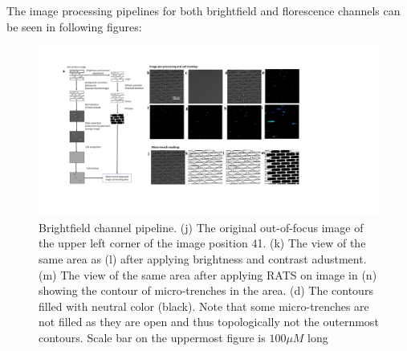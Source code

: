 \documentclass[pdftex,12pt,a4paper]{report}
\begin{document}
The image processing pipelines for both brightfield and florescence channels can be seen in following figures:


\begin{landscape}
\begin{figure}[H]
   \centering
    \includegraphics[height=0.95\textheight]{images/pipeline/01.pdf}
    \caption[Brightfield channel pipeline]{Brightfield channel pipeline. (j) The original out-of-focus image of the upper left corner of  the image position 41. (k) The view of the same area as (l) after applying brightness and contrast adustment. (m) The view of the same area after applying RATS on image in (n) showing the contour of micro-trenches in the area. (d) The contours filled with neutral color (black). Note that some micro-trenches are not filled as they are open and thus topologically not the outernmost contours. Scale bar on the uppermost figure is $100 \mu M$ long}
\end{figure}
\label{fig:pipeline1}
\end{landscape}
\end{document}
